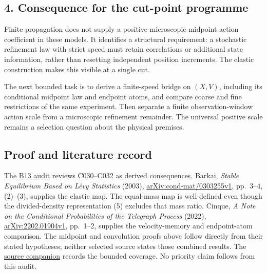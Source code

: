 \documentclass[11pt,a4paper]{article}
\begin{document}
\hypertarget{consequence-for-the-cut-point-programme}{%
\subsection{4. Consequence for the cut-point
programme}\label{consequence-for-the-cut-point-programme}}

Finite propagation does not supply a positive microscopic midpoint
action coefficient in these models. It identifies a structural
requirement: a stochastic refinement law with strict speed must retain
correlations or additional state information, rather than resetting
independent position increments. The elastic construction makes this
visible at a single cut.

The next bounded task is to derive a finite-speed bridge on \((X,V)\),
including its conditional midpoint law and endpoint atoms, and compare
coarse and fine restrictions of the same experiment. Then separate a
finite observation-window action scale from a microscopic refinement
remainder. The universal positive scale remains a selection question
about the physical premises.

\hypertarget{proof-and-literature-record}{%
\subsection{Proof and literature
record}\label{proof-and-literature-record}}

The \href{../references/batches/B13.md}{B13 audit} reviews C030--C032 as
derived consequences. Barkai, \emph{Stable Equilibrium Based on Lévy
Statistics} (2003),
\href{https://arxiv.org/abs/cond-mat/0303255v1}{arXiv:cond-mat/0303255v1},
pp.~3--4, (2)--(3), supplies the elastic map. The equal-mass map is
well-defined even though the divided-density representation (5) excludes
that mass ratio. Cinque, \emph{A Note on the Conditional Probabilities
of the Telegraph Process} (2022),
\href{https://arxiv.org/abs/2202.01904v1}{arXiv:2202.01904v1}, pp.~1--2,
supplies the velocity-memory and endpoint-atom comparison. The midpoint
and convolution proofs above follow directly from their stated
hypotheses; neither selected source states those combined results. The
\href{../docs/batches/B13/B13-source-companion.md}{source companion}
records the bounded coverage. No priority claim follows from this audit.
\end{document}
